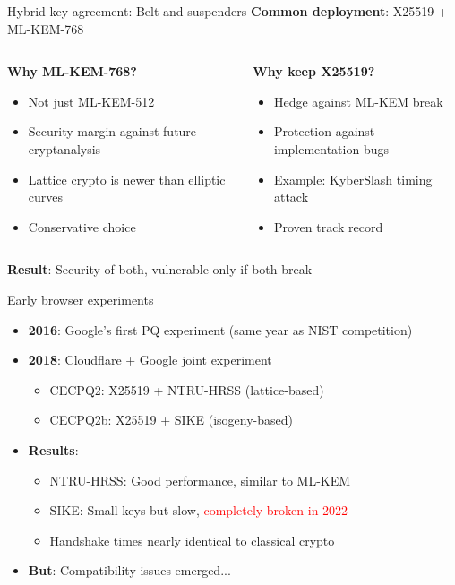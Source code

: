 \documentclass[aspectratio=169, lualatex, handout]{beamer}
\begin{document}
\begin{frame}{Hybrid key agreement: Belt and suspenders}
	\textbf{Common deployment}: X25519 + ML-KEM-768
	\vspace{3mm}
	\begin{columns}[c]
		\begin{column}{0.5\textwidth}
			\textbf{Why ML-KEM-768?}
			\begin{itemize}
				\item Not just ML-KEM-512
				\item Security margin against future cryptanalysis
				\item Lattice crypto is newer than elliptic curves
				\item Conservative choice
			\end{itemize}
		\end{column}
		\begin{column}{0.5\textwidth}
			\textbf{Why keep X25519?}
			\begin{itemize}
				\item Hedge against ML-KEM break
				\item Protection against implementation bugs
				\item Example: KyberSlash timing attack
				\item Proven track record
			\end{itemize}
		\end{column}
	\end{columns}
	\vspace{5mm}
	\begin{center}
		\textbf{Result}: Security of both, vulnerable only if both break
	\end{center}
\end{frame}

\begin{frame}{Early browser experiments}
	\begin{itemize}
		\item \textbf{2016}: Google's first PQ experiment (same year as NIST competition)
		\item \textbf{2018}: Cloudflare + Google joint experiment
		      \begin{itemize}
			      \item CECPQ2: X25519 + NTRU-HRSS (lattice-based)
			      \item CECPQ2b: X25519 + SIKE (isogeny-based)
		      \end{itemize}
		\item \textbf{Results}:
		      \begin{itemize}
			      \item NTRU-HRSS: Good performance, similar to ML-KEM
			      \item SIKE: Small keys but slow, \textcolor{red}{completely broken in 2022}
			      \item Handshake times nearly identical to classical crypto
		      \end{itemize}
		\item \textbf{But}: Compatibility issues emerged...
	\end{itemize}
\end{frame}
\end{document}
